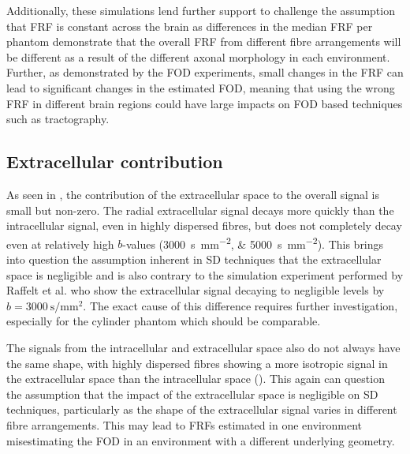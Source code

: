 Additionally, these simulations lend further support to challenge the assumption that \ac{FRF} is constant across the brain as differences in the median \ac{FRF} per phantom demonstrate that the overall \ac{FRF} from different fibre arrangements will be different as a result of the different axonal morphology in each environment. Further, as demonstrated by the \ac{FOD} experiments, small changes in the \ac{FRF} can lead to significant changes in the estimated \ac{FOD}, meaning that using the wrong \ac{FRF} in different brain regions could have large impacts on \ac{FOD} based techniques such as tractography. 


\subsection{Extracellular contribution}
\label{sec:frf_discussion_extra_contribution}
As seen in , the contribution of the extracellular space to the overall signal is small but non-zero.
The radial extracellular signal decays more quickly than the intracellular signal, even in highly dispersed fibres, but does not completely decay even at relatively high $b$-values (\SIlist{3000; 5000}{\second\per\milli\metre\squared}).
This brings into question the assumption inherent in \ac{SD} techniques that the extracellular space is negligible and is also contrary to the simulation experiment performed by Raffelt et al. \cite{Raffelt2012} who show the extracellular signal decaying to negligible levels by $b=\SI{3000}{\second\per\milli\metre\squared}$. The exact cause of this difference requires further investigation, especially for the cylinder phantom which should be comparable.

The signals from the intracellular and extracellular space also do not always have the same shape, with highly dispersed fibres showing a more isotropic signal in the extracellular space than the intracellular space ().
This again can question the assumption that the impact of the extracellular space is negligible on \ac{SD} techniques, particularly as the shape of the extracellular signal varies in different fibre arrangements. This may lead to \ac{FRF}s estimated in one environment misestimating the \ac{FOD} in an environment with a different underlying geometry.

